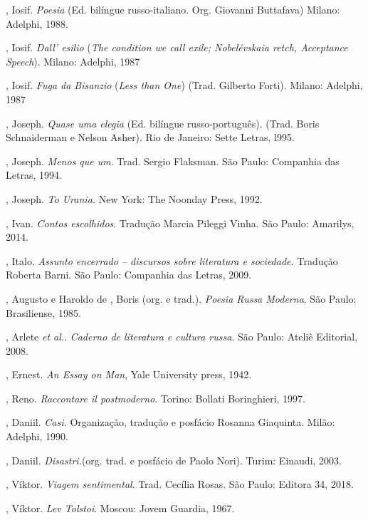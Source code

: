 \begin{Parskip}
, Iosif. \emph{Poesia} (Ed. bilíngue russo-italiano. Org.
Giovanni Buttafava) Milano: Adelphi, 1988.

, Iosif. \emph{Dall' esilio} (\emph{The condition we call exile;
Nobelévskaia retch, Acceptance Speech}). Milano: Adelphi, 1987

, Iosif. \emph{Fuga da Bisanzio} (\emph{Less than One}) (Trad.
Gilberto Forti). Milano: Adelphi, 1987

, Joseph. \emph{Quase uma elegia} (Ed. bilíngue russo-português).
(Trad. Boris Schnaiderman e Nelson Asher). Rio de Janeiro: Sette Letras,
l995.

, Joseph. \emph{Menos que um}. Trad. Sergio Flaksman. São
Paulo: Companhia das Letras, 1994.

, Joseph. \emph{To Urania.} New York: The Noonday Press, 1992.

, Ivan. \emph{Contos escolhidos}. Tradução Marcia Pileggi Vinha. São Paulo: Amarilys, 2014.

, Italo. \emph{Assunto encerrado -- discursos sobre literatura e
sociedade.} Tradução Roberta Barni. São Paulo: Companhia das Letras, 2009.

, Augusto e Haroldo de , Boris (org. e trad.).
\emph{Poesia Russa Moderna}. São Paulo: Brasiliense, 1985.

, Arlete \emph{et al.}. \emph{Caderno de literatura e cultura
russa}. São Paulo: Ateliê Editorial, 2008.

, Ernest. \emph{An Essay on Man}, Yale University press, 1942.

, Reno. \emph{Raccontare il postmoderno}. Torino: Bollati Boringhieri,
1997.

, Daniil. \emph{Casi.} Organização, tradução e posfácio Rosanna
Giaquinta. Milão: Adelphi, 1990.

, Daniil. \emph{Disastri.}(org. trad. e posfácio de Paolo Nori). Turim: Einaudi, 2003.

, Víktor. \emph{Viagem sentimental}. Trad. Cecília Rosas. São
Paulo: Editora 34, 2018.

, Víktor. \emph{Lev Tolstoi}. Moscou: Jovem Guardia, 1967.


\end{Parskip}
